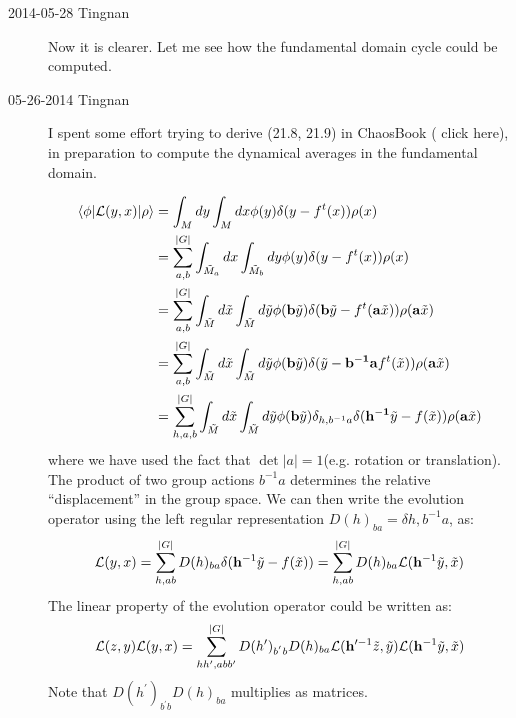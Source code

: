 \begin{description}
\item[2014-05-28 Tingnan] Now it is clearer. Let me see how the fundamental domain cycle could be computed.

\item[05-26-2014 Tingnan]

I spent some effort trying to derive (21.8, 21.9) in ChaosBook  (
{click here}), in preparation to compute the dynamical averages in the fundamental domain.

\begin{align*}
\left\langle \phi\vert{\cal L}(y,x)\vert\rho\right\rangle  &= \int_{M}dy\int_{M}dx\phi(y)\delta(y-f^{t}(x))\rho(x)\\
 &= \sum_{a,b}^{\vert G\vert}\int_{\tilde{M}_{a}}dx\int_{\tilde{M}_{b}}dy\phi(y)\delta(y-f^{t}(x))\rho(x)\\
 &= \sum_{a,b}^{\vert G\vert}\int_{\tilde{M}}d\tilde{x}\int_{\tilde{M}}d\tilde{y}\phi(\mathbf{b}\tilde{y})\delta(\mathbf{b}\tilde{y}-f^{t}(\mathbf{a}\tilde{x}))\rho(\mathbf{a}\tilde{x})\\
 &= \sum_{a,b}^{\vert G\vert}\int_{\tilde{M}}d\tilde{x}\int_{\tilde{M}}d\tilde{y}\phi(\mathbf{b}\tilde{y})\delta(\tilde{y}-\mathbf{b^{-1}}\mathbf{a}f^{t}(\tilde{x}))\rho(\mathbf{a}\tilde{x})\\
 &= \sum_{h,a,b}^{\vert G\vert}\int_{\tilde{M}}d\tilde{x}\int_{\tilde{M}}d\tilde{y}\phi(\mathbf{b}\tilde{y})\delta_{h,b^{-1}a}\delta(\mathbf{h^{-1}}\tilde{y}-f(\tilde{x}))\rho(\mathbf{a}\tilde{x})
\end{align*}
where we have used the fact that $\det \vert a\vert=1$(e.g.
rotation or translation). The product of two group actions $b^{-1}a$
determines the relative ``displacement'' in the group space. We
can then write the evolution operator using the left regular representation
$D(h)_{ba}=\delta h,b^{-1}a$, as:
\[
{\cal L}(y,x)=\sum_{h,ab}^{\vert G\vert}D(h)_{ba}\delta(\mathbf{h}^{-1}\tilde{y}-f(\tilde{x}))=\sum_{h,ab}^{\vert G\vert}D(h)_{ba}{\cal L}(\mathbf{h}^{-1}\tilde{y},\tilde{x})
\]
The linear property of the evolution operator could be written as:
\[
{\cal L}(z,y){\cal L}(y,x)=\sum_{hh^{\prime},abb^{\prime}}^{\vert G\vert}D(h^{\prime})_{b^{'}b}D(h)_{ba}{\cal L}(\mathbf{h}^{\prime-1}\tilde{z},\tilde{y}){\cal L}(\mathbf{h}^{-1}\tilde{y},\tilde{x})
\]
Note that $D(h^{\prime})_{b^{'}b}D(h)_{ba}$ multiplies as matrices.


\end{description}

